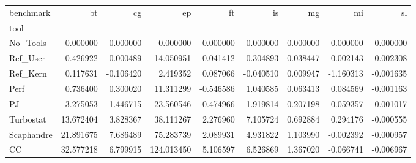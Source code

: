 \begin{tabular}{lrrrrrrrr}
\toprule
benchmark & bt & cg & ep & ft & is & mg & mi & sl \\
tool &  &  &  &  &  &  &  &  \\
\midrule
No_Tools & 0.000000 & 0.000000 & 0.000000 & 0.000000 & 0.000000 & 0.000000 & 0.000000 & 0.000000 \\
Ref_User & 0.426922 & 0.000489 & 14.050951 & 0.041412 & 0.304893 & 0.038447 & -0.002143 & -0.002308 \\
Ref_Kern & 0.117631 & -0.106420 & 2.419352 & 0.087066 & -0.040510 & 0.009947 & -1.160313 & -0.001635 \\
Perf & 0.736400 & 0.300020 & 11.311299 & -0.546586 & 1.040585 & 0.063413 & 0.084569 & -0.001163 \\
PJ & 3.275053 & 1.446715 & 23.560546 & -0.474966 & 1.919814 & 0.207198 & 0.059357 & -0.001017 \\
Turbostat & 13.672404 & 3.828367 & 38.111267 & 2.276960 & 7.105724 & 0.692884 & 0.294176 & -0.000555 \\
Scaphandre & 21.891675 & 7.686489 & 75.283739 & 2.089931 & 4.931822 & 1.103990 & -0.002392 & -0.000957 \\
CC & 32.577218 & 6.799915 & 124.013450 & 5.106597 & 6.526869 & 1.367020 & -0.066741 & -0.006967 \\
\bottomrule
\end{tabular}
